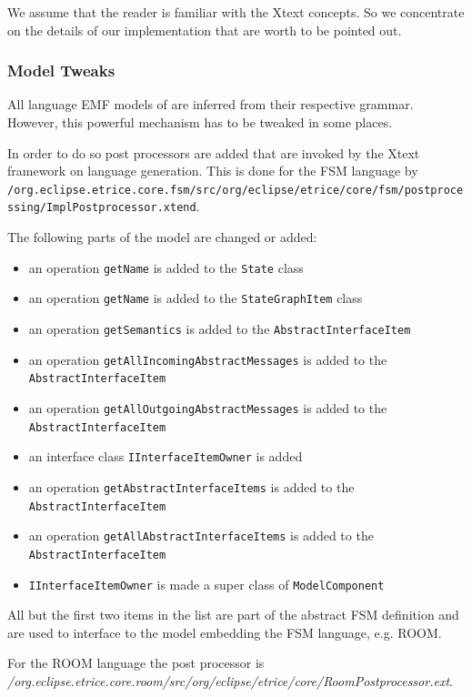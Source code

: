We assume that the reader is familiar with the Xtext concepts. So we concentrate on the details of our 
implementation that are worth to be pointed out.

\subsubsection{Model Tweaks}

All language EMF models of \eTrice{} are inferred from their respective grammar.
However, this powerful mechanism has to be tweaked in some places.

In order to do so post processors are added that are invoked by the Xtext framework on language generation.
This is done for the FSM language by \texttt{/org.eclipse.etrice.core.fsm/src/org/eclipse/etrice/core/fsm/postprocessing/ImplPostprocessor.xtend}.

The following parts of the model are changed or added:
\begin{itemize}
\item an operation \texttt{getName} is added to the \texttt{State} class
\item an operation \texttt{getName} is added to the \texttt{StateGraphItem} class
\item an operation \texttt{getSemantics} is added to the \texttt{AbstractInterfaceItem}
\item an operation \texttt{getAllIncomingAbstractMessages} is added to the \texttt{AbstractInterfaceItem}
\item an operation \texttt{getAllOutgoingAbstractMessages} is added to the \texttt{AbstractInterfaceItem}
\item an interface class \texttt{IInterfaceItemOwner} is added
\item an operation \texttt{getAbstractInterfaceItems} is added to the \texttt{AbstractInterfaceItem}
\item an operation \texttt{getAllAbstractInterfaceItems} is added to the \texttt{AbstractInterfaceItem}
\item \texttt{IInterfaceItemOwner} is made a super class of \texttt{ModelComponent}
\end{itemize}
All but the first two items in the list are part of the abstract FSM definition and are used to interface
to the model embedding the FSM language, e.g. ROOM.

For the ROOM language the post processor is
\textit{/org.eclipse.etrice.core.room/src/org/eclipse/etrice/core/RoomPostprocessor.ext}.

